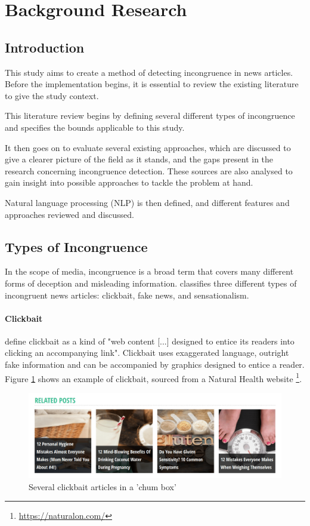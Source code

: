 \section{Background Research}\label{lit}
\subsection{Introduction}
This study aims to create a method of detecting incongruence in news articles. Before the implementation begins, it is essential to review the existing literature to give the study context.

This literature review begins by defining several different types of incongruence and specifies the bounds applicable to this study. 

It then goes on to evaluate several existing approaches, which are discussed to give a clearer picture of the field as it stands, and the gaps present in the research concerning incongruence detection. These sources are also analysed to gain insight into possible approaches to tackle the problem at hand.

Natural language processing (NLP) is then defined, and different features and approaches reviewed and discussed.

\subsection{Types of Incongruence}

In the scope of media, incongruence is a broad term that covers many different forms of deception and misleading information.  classifies three different types of incongruent news articles: clickbait, fake news, and sensationalism.

\paragraph{Clickbait}
 define clickbait as a kind of "web content [...] designed to entice its readers into clicking an accompanying link". Clickbait uses exaggerated language, outright fake information and can be accompanied by graphics designed to entice a reader. Figure \ref{fig:clickbait} shows an example of clickbait, sourced from a Natural Health website \footnote{\url{https://naturalon.com/}}.

\begin{figure}[ht!]
  \includegraphics[width=\linewidth]{images/clickbait.png}
  \caption{Several clickbait articles in a 'chum box'}
  \label{fig:clickbait}
\end{figure}

